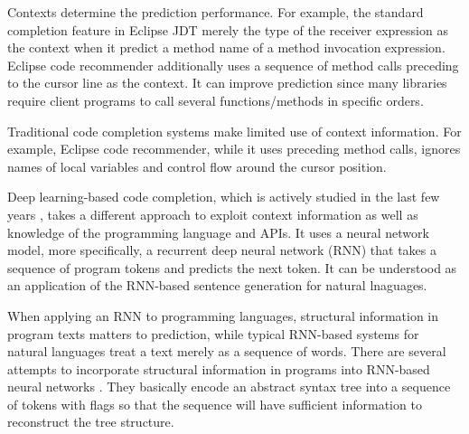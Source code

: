 \documentclass[E]{compsoft}
\begin{document}
Contexts determine the prediction performance.  For example, the standard completion feature in Eclipse JDT merely the type of the receiver expression as the context when it predict a method name of a method invocation expression.  Eclipse code recommender \cite{heinemann2011suite} additionally uses a sequence of method calls preceding to the cursor line as the context.  It can improve prediction 
since many libraries require client programs to call several functions/methods in specific orders.

Traditional code completion systems make limited use of context information.  For example, Eclipse code recommender, while it uses preceding method calls, ignores names of local variables and control flow around the cursor position.  %


Deep learning-based code completion, which is actively studied in the last few years \cite{liu2016neural,dataset,raychev2014code,white2015toward}, takes a different approach to exploit context information as well as knowledge of the programming language and APIs.  
It uses a neural network model, more specifically, a recurrent deep neural network (RNN) that takes a sequence of program tokens and predicts the next token.  It can be understood as an application of the RNN-based sentence generation for natural lnaguages.%

When applying an RNN to programming languages, structural information in program texts matters to prediction, while typical RNN-based systems for natural languages  treat a text merely as a sequence of words.  There are several attempts to incorporate structural information in programs into RNN-based neural networks \cite{bielik2016phog,liu2016neural,raychev2016probabilistic}.  They basically encode an abstract syntax tree into a sequence of tokens with flags so that the sequence will have sufficient information to reconstruct the tree structure.
\end{document}
